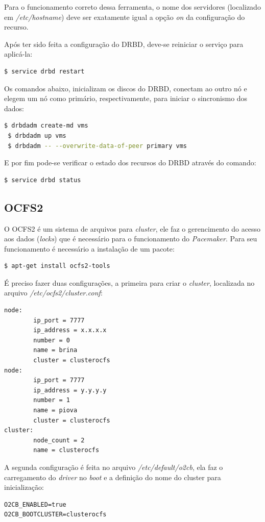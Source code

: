 Para o funcionamento correto dessa ferramenta, o nome dos servidores (localizado em \textit{/etc/hostname}) deve ser exatamente igual a opção
\textit{on} da configuração do recurso.

Após ter sido feita a configuração do \ac{DRBD}, deve-se reiniciar o serviço para aplicá-la:
\begin{lstlisting}[language=bash]
 $ service drbd restart 
\end{lstlisting}

Os comandos abaixo, inicializam os discos do \ac{DRBD}, conectam ao outro nó e elegem um nó como primário, respectivamente, para iniciar o 
sincronismo dos dados:
\begin{lstlisting}[language=bash]
 $ drbdadm create-md vms
 $ drbdadm up vms
 $ drbdadm -- --overwrite-data-of-peer primary vms
\end{lstlisting}

E por fim pode-se verificar o estado dos recursos do \ac{DRBD} através do comando:
\begin{lstlisting}[language=bash]
 $ service drbd status
\end{lstlisting}

\subsection{OCFS2}

O \ac{OCFS2} é um sistema de arquivos para \textit{cluster}, ele faz o gerencimento do acesso aos dados (\textit{locks}) que é necessário para o 
funcionamento do \textit{Pacemaker}. Para seu funcionamento é necessário a instalação de um pacote:
\begin{lstlisting}[language=bash]
 $ apt-get install ocfs2-tools
\end{lstlisting}

É preciso fazer duas configurações, a primeira para criar o \textit{cluster}, localizada no arquivo \textit{/etc/ocfs2/cluster.conf}:
\begin{lstlisting}
node:
        ip_port = 7777
        ip_address = x.x.x.x
        number = 0
        name = brina
        cluster = clusterocfs
node:
        ip_port = 7777
        ip_address = y.y.y.y
        number = 1
        name = piova
        cluster = clusterocfs
cluster:
        node_count = 2
        name = clusterocfs
\end{lstlisting}

A segunda configuração é feita no arquivo \textit{/etc/default/o2cb}, ela faz o carregamento do \textit{driver} no \textit{boot} e a definição 
do nome do cluster para inicialização:
\begin{lstlisting}
O2CB_ENABLED=true
O2CB_BOOTCLUSTER=clusterocfs
\end{lstlisting}

